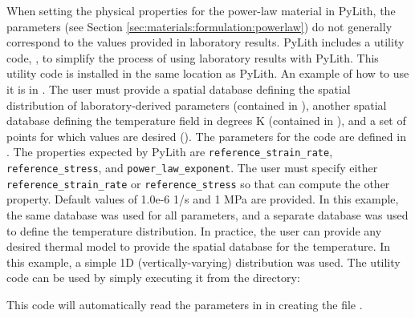 When setting the physical properties for the power-law material in
PyLith, the parameters (see Section
\vref{sec:materials:formulation:powerlaw}) do not generally correspond
to the values provided in laboratory results.  PyLith includes a
utility code, , to simplify the process
of using laboratory results with PyLith. This utility code is
installed in the same location as PyLith. An example of how to use it
is in . The user must
provide a spatial database defining the spatial distribution of
laboratory-derived parameters (contained in
), another spatial database
defining the temperature field in degrees K (contained in
), and a set of points for which
values are desired ().  The parameters
for the code are defined in .  The
properties expected by PyLith are \texttt{reference\_strain\_rate},
\texttt{reference\_stress}, and \texttt{power\_law\_exponent}. The
user must specify either \texttt{reference\_strain\_rate} or
\texttt{reference\_stress} so that  can
compute the other property.  Default values of 1.0e-6 1/s and 1 MPa
are provided. In this example, the same database was used for all
parameters, and a separate database was used to define the temperature
distribution. In practice, the user can provide any desired thermal
model to provide the spatial database for the temperature. In this
example, a simple 1D (vertically-varying) distribution was used. The
utility code can be used by simply executing it from the
 directory:
This code will automatically read the parameters in 
in creating the file .


